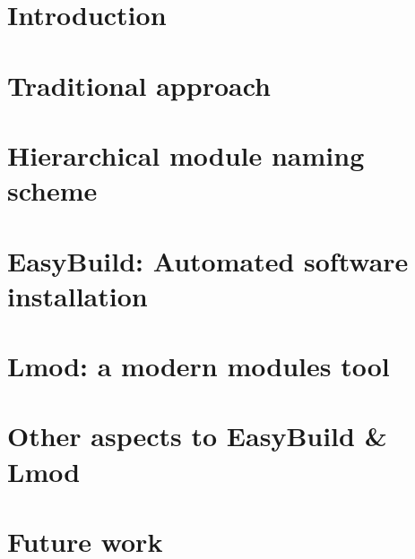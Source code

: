 \documentclass[conference, compsocconf]{IEEEtran}
\newcommand{\easybuild}{\mbox{EasyBuild}}
\begin{document}
%
\IEEEpeerreviewmaketitle



\section{Introduction}\label{sec:intro}


\section{Traditional approach}
\label{sec:traditional}


\section{Hierarchical module naming scheme}
\label{sec:hierarchical}


\section{\easybuild{}: Automated software installation}
\label{sec:easybuild}


\section{Lmod: a modern modules tool}
\label{sec:lmod}


%

\section{Other aspects to EasyBuild \& Lmod}
\label{sec:communities_synergy}


\section{Future work}
\label{sec:future_work}

\end{document}
